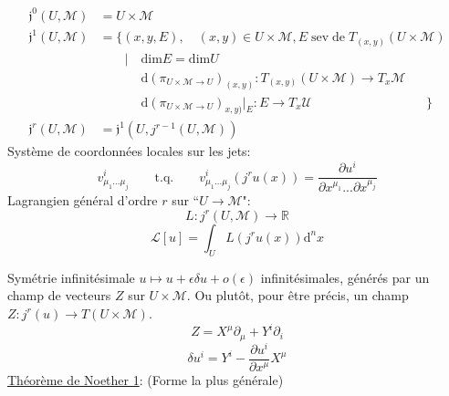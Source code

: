 \documentclass[a4paper,11pt]{article}
\renewcommand{\d}{{\mathrm{d}}}
\newcommand{\dr}[2]{\frac{\partial {#1}}{\partial{#2}}}
\begin{document}
\begin{align*}
	\mathfrak{j}^0(U,\mathcal{M}) &= U\times\mathcal{M}\\
	\mathfrak{j}^1(U,\mathcal{M}) &= \Big\{(x,y,E), \quad (x,y)\in U\times\mathcal{M}, E \;\mathrm{sev}\;\mathrm{de}\; T_{(x,y)}(U\times\mathcal{M})\\&\quad \quad| \quad \mathrm{dim}E=\mathrm{dim}U\\
	&\quad\quad\quad\;\d (\pi_{U\times\mathcal{M}\to U})_{(x,y)}: T_{(x,y)}(U\times\mathcal{M})\to T_x\mathcal{M}
	\\&\quad\quad\quad\; \d (\pi_{U\times\mathcal{M}\to U})_{x,y)}|_E : E\to T_x\mathcal{U}\quad\quad\quad\quad\quad\quad\quad\quad\quad\Big\}\\
	\mathfrak{j}^r(U,\mathcal{M}) &= \mathfrak{j}^1(U, j^{r-1}(U,\mathcal{M}))
\end{align*}
Système de coordonnées locales sur les jets:
$$v^i_{\mu_1...\mu_j} \quad\quad \mathrm{t}.\mathrm{q}. \quad\quad v^i_{\mu_1...\mu_j}(j^ru(x))=\dr{u^i}{x^{\mu_1}...\partial x^{\mu_j}}$$
Lagrangien général d'ordre $r$ sur ``$U\to\mathcal{M}$":
$$L : j^r(U,\mathcal{M}) \to \mathbb{R}$$
$$\mathcal{L}[u] = \int_{U} L(j^r u(x))\d^n x$$

Symétrie infinitésimale $u\mapsto u+\epsilon\delta u + o(\epsilon)$ infinitésimales, générés par un champ de vecteurs $Z$ sur $U\times\mathcal{M}$. Ou plutôt, pour être précis, un champ $Z:j^r(u)\to T(U\times\mathcal{M})$.
$$Z = X^\mu \partial_\mu + Y^i  \partial_i$$
$$\delta u^i = Y^i - \dr{u^i}{x^\mu}X^\mu$$
\underline{Théorème de Noether 1}: (Forme la plus générale)
\end{document}
